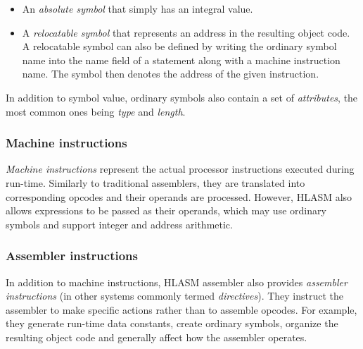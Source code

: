 \begin{itemize}
	\item An \emph{absolute symbol} that simply has an integral value.
	\item A \emph{relocatable symbol} that represents an address in the resulting object code. A relocatable symbol can also be defined by writing the ordinary symbol name into the name field of a statement along with a machine instruction name. The symbol then denotes the address of the given instruction.
\end{itemize}

In addition to symbol value, ordinary symbols also contain a set of \emph{attributes}, the most common ones being \emph{type} and \emph{length}.

\subsubsection{Machine instructions}
\label{mach_instr}

\emph{Machine instructions} represent the actual processor instructions executed during run-time. Similarly to traditional assemblers, they are translated into corresponding opcodes and their operands are processed. However, HLASM also allows expressions to be passed as their operands, which may use ordinary symbols and support integer and address arithmetic.

\subsubsection{Assembler instructions}
\label{asm_instrs}

In addition to machine instructions, HLASM assembler also provides \emph{assembler instructions} (in other systems commonly termed \emph{directives}). They instruct the assembler to make specific actions rather than to assemble opcodes. For example, they generate run-time data constants, create ordinary symbols, organize the resulting object code and generally affect how the assembler operates.

